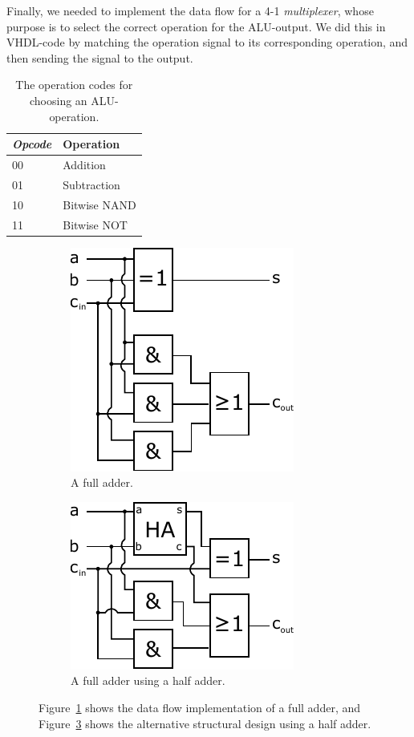 \documentclass[a4,11pt]{article}
\begin{document}
Finally, we needed to implement the data flow for a 4-1 {\it multiplexer}, whose purpose is to
select the correct operation for the ALU-output. We did this in VHDL-code by matching the operation
signal to its corresponding operation, and then sending the signal to the output.

\begin{table}   
	\centering
	\small
	\def\arraystretch{1.1}              
	\begin{tabular}{|l|l|}
		\hline
		{\it Opcode}    & {\bf Operation} \\ \hline
		00              & Addition        \\ 
		01              & Subtraction     \\
		10              & Bitwise NAND    \\ 
		11              & Bitwise NOT     \\ \hline
	\end{tabular}
	\caption{The operation codes for choosing an ALU-operation.}
	\label{tab:op}
\end{table}

\begin{figure}[h!]
	\centering
 	\begin{subfigure}{.5\textwidth}
		\centering
		\includegraphics[height=.3\textheight]{Figurer/fa}
		\caption{A full adder.}
		\label{fig:fa} 
	\end{subfigure}%
	\begin{subfigure}{.5\textwidth}
		\centering
		\includegraphics[height=.3\textheight]{Figurer/fa2}
		\caption{A full adder using a half adder.}
		\label{fig:fa2} 
  	\end{subfigure}
	\caption{Figure~\ref{fig:fa} shows the data flow implementation of a full adder,
		and Figure~\ref{fig:fa2} shows the alternative structural design using a half adder.}
\end{figure}
\end{document}
